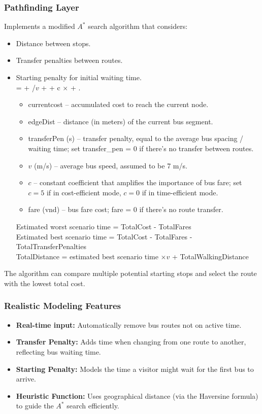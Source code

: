 \subsubsection{Pathfinding Layer}
Implements a modified $A^*$ search algorithm that considers:
\begin{itemize}
  \item Distance between stops.
  \item Transfer penalties between routes.
  \item Starting penalty for initial waiting time. \\
     =  + /$v$ +  + c $\times$  + .

    \begin{itemize}
        \item currentcost -- accumulated cost to reach the current node.
        \item edgeDist -- distance (in meters) of the current bus segment.
        \item transferPen (s) -- transfer penalty, equal to the average bus spacing / waiting time; set transfer\_pen = 0 if there’s no transfer between routes.
        \item $v$ (m/s) -- average bus speed, assumed to be 7 m/s.
        \item $c$ -- constant coefficient that amplifies the importance of bus fare; set $c = 5$ if in cost-efficient mode, $c = 0$ if in time-efficient mode.
        \item fare (vnd) -- bus fare cost; fare = 0 if there’s no route transfer.
    \end{itemize}
    Estimated worst scenario time = TotalCost - TotalFares \\
    Estimated best scenario time = TotalCost - TotalFares - TotalTransferPenalties \\
    TotalDistance = estimated best scenario time $\times v$ + TotalWalkingDistance
\end{itemize}
The algorithm can compare multiple potential starting stops and select the route with the lowest total cost.

\subsubsection{Realistic Modeling Features}
\begin{itemize}
  \item \textbf{Real-time input:} Automatically remove bus routes not on active time.
  \item \textbf{Transfer Penalty:} Adds time when changing from one route to another, reflecting bus waiting time.
  \item \textbf{Starting Penalty:} Models the time a visitor might wait for the first bus to arrive.
  \item \textbf{Heuristic Function:} Uses geographical distance (via the Haversine formula) to guide the $A^*$ search efficiently.
\end{itemize}


